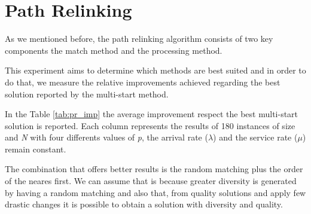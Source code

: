 \section{Path Relinking}
As we mentioned before,
the path relinking algorithm
consists of two key components
the match method and the processing method.

This experiment aims to determine which methods are best suited
and in order to do that,
we measure the relative improvements
achieved regarding the best solution
reported by the multi-start method.

In the Table \ref{tab:pr_imp}
the average improvement
respect the best multi-start solution is reported.
Each column
represents the results
of 180 instances
of size  and \textit{N}
with four differents values of \textit{p},
the arrival rate ($\lambda$)
and the service rate ($\mu$)
remain constant.

The combination that offers better results
is the random matching
plus
the order of the neares first.
We can assume that is
because greater diversity
is generated by having a random matching
and also that,
from quality solutions
and apply few drastic changes
it is possible to obtain a solution with diversity and quality.
